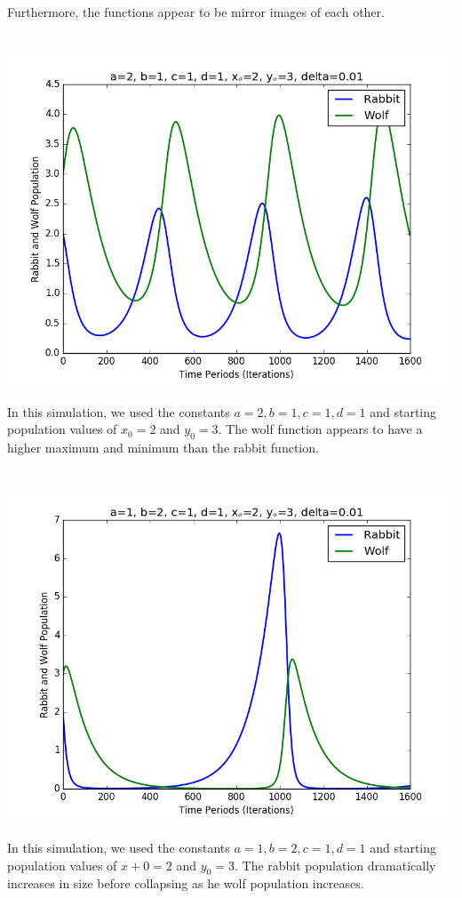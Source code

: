 \documentclass{article}
\begin{document}
Furthermore, the functions appear to be mirror images of each other.\\
\\
\centerline{\includegraphics[scale=0.5]{exercise5/figure_1-2.png}}
In this simulation, we used the constants $a=2, b=1, c=1, d=1$ and starting population values of $x_0=2$ and $y_0=3$.
The wolf function appears to have a higher maximum and minimum than the rabbit function.\\
\\
\centerline{\includegraphics[scale=0.5]{exercise5/figure_1-3.png}}
In this simulation, we used the constants $a=1, b=2, c=1, d=1$ and starting population values of $x+0=2$ and $y_0=3$.
The rabbit population dramatically increases in size before collapsing as he wolf population increases.\\
\end{document}

